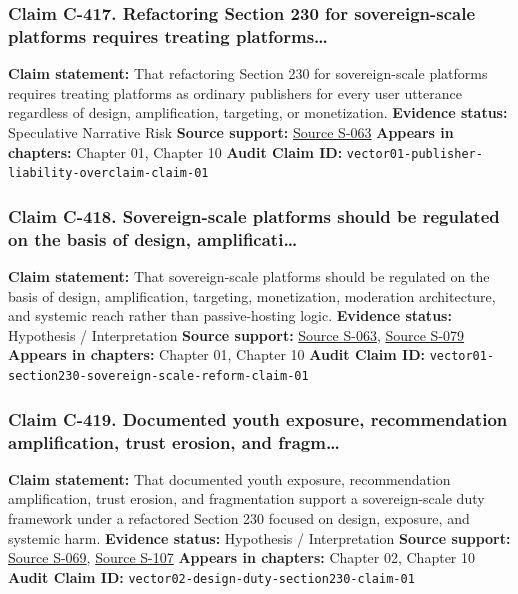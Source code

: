 \documentclass[
  american,
  11pt,
  letterpaper,
]{article}
\begin{document}
\subsubsection{Claim C-417. Refactoring Section 230 for sovereign-scale
platforms requires treating
platforms\ldots{}}\label{claim-c-417-refactoring-section-230-for-sovereign-scale-platforms-requires-treating-platforms}

\textbf{Claim statement:} That refactoring Section 230 for
sovereign-scale platforms requires treating platforms as ordinary
publishers for every user utterance regardless of design, amplification,
targeting, or monetization. \textbf{Evidence status:} Speculative
Narrative Risk \textbf{Source support:}
\hyperref[source-s-063-a-look-behind-the-screens-examining-the-data-practices-of-social-media-and-video-streaming-services]{Source
S-063} \textbf{Appears in chapters:} Chapter 01, Chapter 10
\textbf{Audit Claim ID:}
\texttt{vector01-publisher-liability-overclaim-claim-01}

\subsubsection{Claim C-418. Sovereign-scale platforms should be
regulated on the basis of design,
amplificati\ldots{}}\label{claim-c-418-sovereign-scale-platforms-should-be-regulated-on-the-basis-of-design-amplificati}

\textbf{Claim statement:} That sovereign-scale platforms should be
regulated on the basis of design, amplification, targeting,
monetization, moderation architecture, and systemic reach rather than
passive-hosting logic. \textbf{Evidence status:} Hypothesis /
Interpretation \textbf{Source support:}
\hyperref[source-s-063-a-look-behind-the-screens-examining-the-data-practices-of-social-media-and-video-streaming-services]{Source
S-063},
\hyperref[source-s-079-meta-platforms-inc-2023-annual-report-form-10-k]{Source
S-079} \textbf{Appears in chapters:} Chapter 01, Chapter 10
\textbf{Audit Claim ID:}
\texttt{vector01-section230-sovereign-scale-reform-claim-01}

\subsubsection{Claim C-419. Documented youth exposure, recommendation
amplification, trust erosion, and
fragm\ldots{}}\label{claim-c-419-documented-youth-exposure-recommendation-amplification-trust-erosion-and-fragm}

\textbf{Claim statement:} That documented youth exposure, recommendation
amplification, trust erosion, and fragmentation support a
sovereign-scale duty framework under a refactored Section 230 focused on
design, exposure, and systemic harm. \textbf{Evidence status:}
Hypothesis / Interpretation \textbf{Source support:}
\hyperref[source-s-069-social-media-and-youth-mental-health-the-u-s-surgeon-general-s-advisory]{Source
S-069},
\hyperref[source-s-107-social-media-seen-as-mostly-good-for-democracy-across-many-nations-but-u-s-is-a-major-outlier]{Source
S-107} \textbf{Appears in chapters:} Chapter 02, Chapter 10
\textbf{Audit Claim ID:}
\texttt{vector02-design-duty-section230-claim-01}
\end{document}
